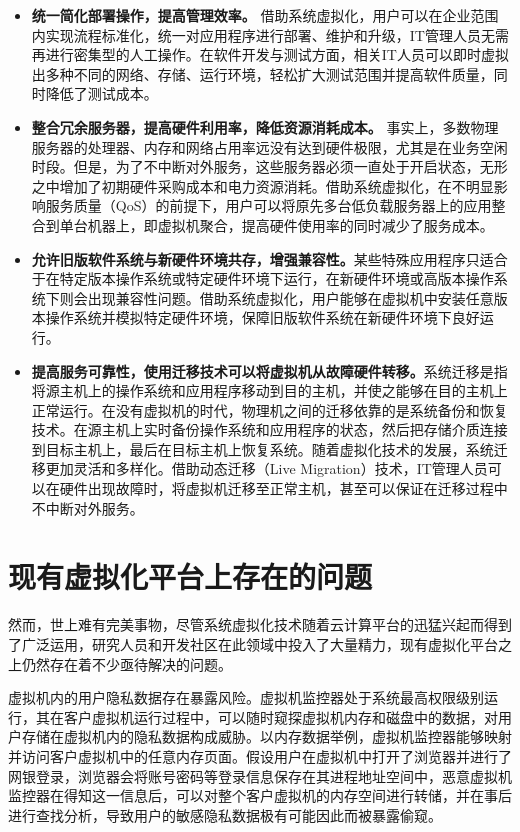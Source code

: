 \begin{itemize}
\item \textbf{统一简化部署操作，提高管理效率。}
借助系统虚拟化，用户可以在企业范围内实现流程标准化，统一对应用程序进行部署、维护和升级，IT管理人员无需再进行密集型的人工操作。在软件开发与测试方面，相关IT人员可以即时虚拟出多种不同的网络、存储、运行环境，轻松扩大测试范围并提高软件质量，同时降低了测试成本。
\item \textbf{整合冗余服务器，提高硬件利用率，降低资源消耗成本。}
事实上，多数物理服务器的处理器、内存和网络占用率远没有达到硬件极限，尤其是在业务空闲时段。但是，为了不中断对外服务，这些服务器必须一直处于开启状态，无形之中增加了初期硬件采购成本和电力资源消耗。借助系统虚拟化，在不明显影响服务质量（QoS）的前提下，用户可以将原先多台低负载服务器上的应用整合到单台机器上，即虚拟机聚合，提高硬件使用率的同时减少了服务成本。
\item \textbf{允许旧版软件系统与新硬件环境共存，增强兼容性。}某些特殊应用程序只适合于在特定版本操作系统或特定硬件环境下运行，在新硬件环境或高版本操作系统下则会出现兼容性问题。借助系统虚拟化，用户能够在虚拟机中安装任意版本操作系统并模拟特定硬件环境，保障旧版软件系统在新硬件环境下良好运行。
\item \textbf{提高服务可靠性，使用迁移技术可以将虚拟机从故障硬件转移。}系统迁移是指将源主机上的操作系统和应用程序移动到目的主机，并使之能够在目的主机上正常运行。在没有虚拟机的时代，物理机之间的迁移依靠的是系统备份和恢复技术。在源主机上实时备份操作系统和应用程序的状态，然后把存储介质连接到目标主机上，最后在目标主机上恢复系统。随着虚拟化技术的发展，系统迁移更加灵活和多样化。借助动态迁移（Live Migration）技术，IT管理人员可以在硬件出现故障时，将虚拟机迁移至正常主机，甚至可以保证在迁移过程中不中断对外服务。
\end{itemize}

\section{现有虚拟化平台上存在的问题}

然而，世上难有完美事物，尽管系统虚拟化技术随着云计算平台的迅猛兴起而得到了广泛运用，研究人员和开发社区在此领域中投入了大量精力，现有虚拟化平台之上仍然存在着不少亟待解决的问题。

虚拟机内的用户隐私数据存在暴露风险。虚拟机监控器处于系统最高权限级别运行，其在客户虚拟机运行过程中，可以随时窥探虚拟机内存和磁盘中的数据，对用户存储在虚拟机内的隐私数据构成威胁。以内存数据举例，虚拟机监控器能够映射并访问客户虚拟机中的任意内存页面。假设用户在虚拟机中打开了浏览器并进行了网银登录，浏览器会将账号密码等登录信息保存在其进程地址空间中，恶意虚拟机监控器在得知这一信息后，可以对整个客户虚拟机的内存空间进行转储，并在事后进行查找分析，导致用户的敏感隐私数据极有可能因此而被暴露偷窥。

